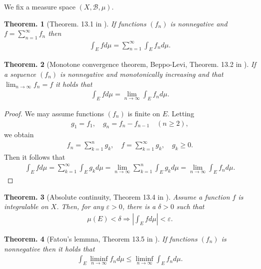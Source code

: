 \documentclass[openany, a4paper, oneside]{book}
\theoremstyle{break}
\newtheorem{thm}{Theorem.}[section]
\theoremstyle{breakdefn}
\newcommand{\abs}[1]{\left|#1\right|}
\newcommand{\rbk}[1]{\left (#1\right)}
\newcommand{\calB}{\mathcal{B}}
\newcommand{\dmu}{d \mu}
\begin{document}
We fix a measure space $(X, \calB, \mu)$.
\begin{thm}[Theorem. 13.1 in \cite{SeizoIto1}]
 If functions $(f_n)$ is nonnegative and $f = \sum_{n=1}^{\infty} f_n$ then
 \begin{align}
  \int_E f \dmu
  =
  \sum_{n=1}^{\infty} \int_E f_n \dmu.
 \end{align}
\end{thm}
\begin{thm}[Monotone convergence theorem, Beppo-Levi, Theorem. 13.2 in \cite{SeizoIto1}]
 If a sequence $(f_n)$ is nonnegative and monotonically increasing and that $\lim_{n \to \infty} f_n = f$ it holds that
 \begin{align}
  \int_E f \dmu
  =
  \lim_{n \to \infty} \int_E f_n \dmu.
 \end{align}
\end{thm}
\begin{proof}
We may assume functions $(f_n)$ is finite on $E$.
Letting
\begin{align}
 g_1 = f_1, \quad
 g_n = f_n - f_{n-1} \quad (n \geq 2),
\end{align}
we obtain
\begin{align}
 f_n
 =
 \sum_{k=1}^n g_k, \quad
 f
 =
 \sum_{k=1}^{\infty} g_k, \quad
 g_k \geq 0.
\end{align}
Then it follows that
\begin{align}
 \int_E f \dmu
 =
 \sum_{k=1}^{\infty} \int_E g_k \dmu
 =
 \lim_{n \to \infty} \sum_{k=1}^n \int_E g_k \dmu
 =
 \lim_{n \to \infty} \int_E f_n \dmu.
\end{align}
\end{proof}
\begin{thm}[Absolute continuity, Theorem 13.4 in \cite{SeizoIto1}]
 Assume a function $f$ is integralable on $X$.
 Then, for any $\varepsilon > 0$, there is a $\delta > 0$ such that
 \begin{align}
  \mu \rbk{E} < \delta
  \Longrightarrow
  \abs{\int_E f \dmu} < \varepsilon.
 \end{align}
\end{thm}
\begin{thm}[Fatou's lemmna, Theorem 13.5 in \cite{SeizoIto1}]
 If functions $(f_n)$ is nonnegative then it holds that
 \begin{align}
  \int_E \liminf_{n \to \infty} f_n \dmu
  \leq
  \liminf_{n \to \infty} \int_E f_n \dmu.
 \end{align}
\end{thm}
\end{document}
